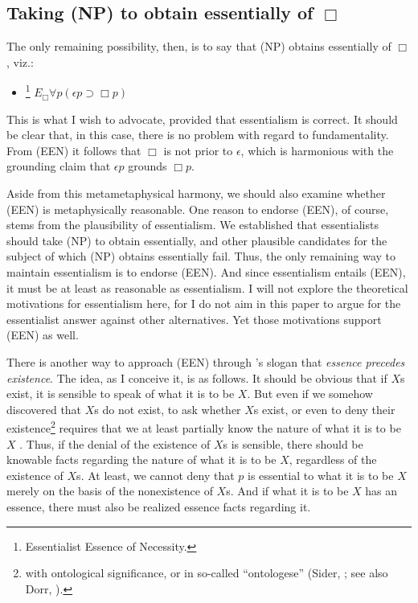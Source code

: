 \documentclass[12pt]{article}
\begin{document}
\subsection{Taking (NP) to obtain essentially of $\Box$}
The only remaining possibility, then, is to say that (NP) obtains essentially of $\Box$, viz.:
\begin{itemize}
    \item[(EEN)]\footnote{Essentialist Essence of Necessity.} $E_\Box \forall p (\epsilon p \supset \Box p)$ 
\end{itemize} 
This is what I wish to advocate, provided that essentialism is correct. It should be clear that, in this case, there is no problem with regard to fundamentality. From (EEN) it follows that $\Box$ is not prior to $\epsilon$, which is harmonious with the grounding claim that $\epsilon p$ grounds $\Box p$. 
\par
Aside from this metametaphysical harmony, we should also examine whether (EEN) is metaphysically reasonable. One reason to endorse (EEN), of course, stems from the plausibility of essentialism. We established that essentialists should take (NP) to obtain essentially, and other plausible candidates for the subject of which (NP) obtains essentially fail. Thus, the only remaining way to maintain essentialism is to endorse (EEN). And since essentialism entails (EEN), it must be at least as reasonable as essentialism. I will not explore the theoretical motivations for essentialism here, for I do not aim in this paper to argue for the essentialist answer against other alternatives. Yet those motivations support (EEN) as well. 
\par
There is another way to approach (EEN) through \citet{Lowe2008-LOWTNO}'s slogan that \textit{essence precedes existence}. The idea, as I conceive it, is as follows. It should be obvious that if $X$s exist, it is sensible to speak of what it is to be $X$. But even if we somehow discovered that $X$s do not exist, to ask whether $X$s exist, or even to deny their existence\footnote{with ontological significance, or in so-called ``ontologese'' (Sider, \citeyear{Sider2009-SIDOR-2}; see also Dorr, \citeyear{Dorr2005-DORWWD}).} requires that we at least partially know the nature of what it is to be $X$ \citep[see also][]{Fine2017-FINNM-2}. Thus, if the denial of the existence of $X$s is sensible, there should be knowable facts regarding the nature of what it is to be $X$, regardless of the existence of $X$s. At least, we cannot deny that $p$ is essential to what it is to be $X$ merely on the basis of the nonexistence of $X$s. And if what it is to be $X$ has an essence, there must also be realized essence facts regarding it.
\end{document}
